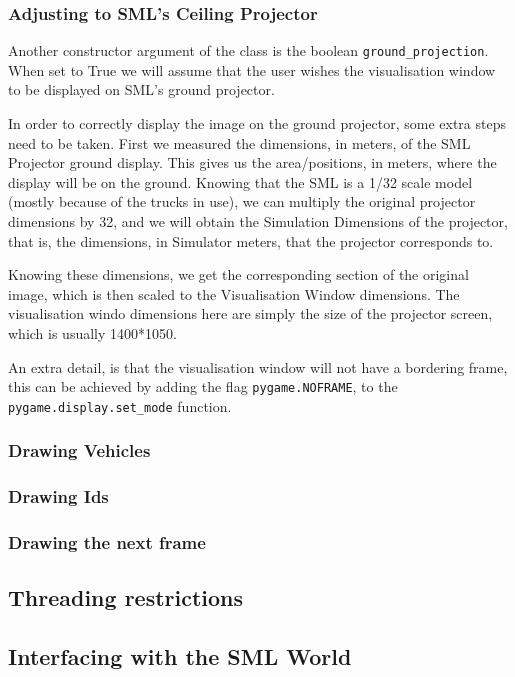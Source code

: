 \subsubsection{Adjusting to SML's Ceiling Projector}

Another constructor argument of the class is the boolean \texttt{ground\_projection}. When set to True we will assume that the user wishes the visualisation window to be displayed on SML's ground projector.

In order to correctly display the image on the ground projector, some extra steps need to be taken. First we measured the dimensions, in meters, of the SML Projector ground display. This gives us the area/positions, in meters, where the display will be on the ground. Knowing that the SML is a 1/32 scale model (mostly because of the trucks in use), we can multiply the original projector dimensions by 32, and we will obtain the Simulation Dimensions of the projector, that is, the dimensions, in Simulator meters, that the projector corresponds to.

Knowing these dimensions, we get the corresponding section of the original image, which is then scaled to the Visualisation Window dimensions. The visualisation windo dimensions here are simply the size of the projector screen, which is usually 1400*1050.

An extra detail, is that the visualisation window will not have a bordering frame, this can be achieved by adding the flag \texttt{pygame.NOFRAME}, to the \texttt{pygame.display.set\_mode} function.

\subsubsection{Drawing Vehicles}


\subsubsection{Drawing Ids}


\subsubsection{Drawing the next frame}


\subsection{Threading restrictions}


\subsection{Interfacing with the SML World}

